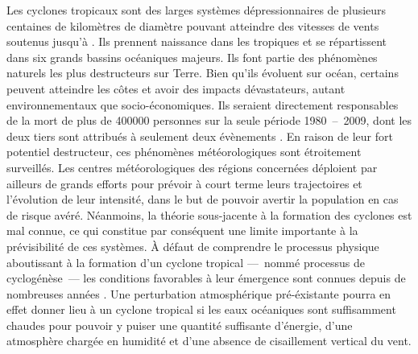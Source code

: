 \documentclass[../main.tex]{subfiles}
\begin{document}
Les cyclones tropicaux sont des larges systèmes dépressionnaires de plusieurs centaines de kilomètres de diamètre pouvant atteindre des vitesses de vents
soutenus jusqu'à . Ils prennent naissance dans les tropiques et se répartissent dans six grands bassins océaniques majeurs. Ils font partie des
phénomènes naturels les plus destructeurs sur Terre. Bien qu'ils évoluent sur océan, certains peuvent atteindre les côtes et avoir des impacts
dévastateurs, autant environnementaux que socio-économiques. Ils seraient directement responsables de la mort de plus de \num{400000} personnes sur la seule
période \num{1980}~--~\num{2009}, dont les deux tiers sont attribués à seulement deux évènements \parencite{doocy_human_2013}. En raison de leur fort potentiel
destructeur, ces phénomènes météorologiques sont étroitement surveillés. Les centres météorologiques des régions concernées déploient par ailleurs de grands
efforts pour prévoir à court terme leurs trajectoires et l'évolution de leur intensité, dans le but de pouvoir avertir la population en cas de risque avéré.
Néanmoins, la théorie sous-jacente à la formation des cyclones est mal connue, ce qui constitue par conséquent une limite importante à la prévisibilité de ces
systèmes. À défaut de comprendre le processus physique aboutissant à la formation d'un cyclone tropical ---~nommé processus de cyclogénèse~--- les conditions
favorables à leur émergence sont connues depuis de nombreuses années \parencite{gray_tropical_1975}. Une perturbation atmosphérique pré-éxistante pourra en
effet donner lieu à un cyclone tropical si les eaux océaniques sont suffisamment chaudes pour pouvoir y puiser une quantité suffisante d'énergie, d'une 
atmosphère chargée en humidité et d'une absence de cisaillement vertical du vent.

\end{document}
